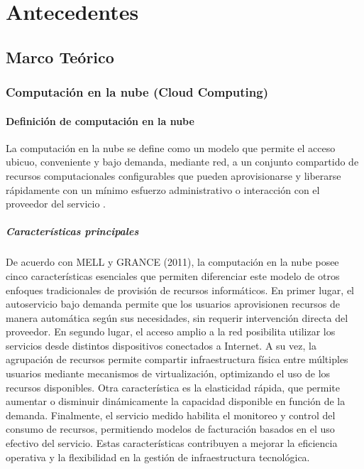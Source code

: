 \chapter{Antecedentes}

\section{Marco Teórico}

\subsection{Computación en la nube (Cloud Computing)}

\subsubsection{Definición de computación en la nube}

La computación en la nube se define como un modelo que permite el acceso ubicuo, conveniente y bajo demanda, mediante red, a un conjunto compartido de recursos computacionales configurables que pueden aprovisionarse y liberarse rápidamente con un mínimo esfuerzo administrativo o interacción con el proveedor del servicio \parencite{Mell2011}.

\paragraph{Características principales}

De acuerdo con MELL y GRANCE (2011), la computación en la nube posee cinco características esenciales que permiten diferenciar este modelo de otros enfoques tradicionales de provisión de recursos informáticos. En primer lugar, el autoservicio bajo demanda permite que los usuarios aprovisionen recursos de manera automática según sus necesidades, sin requerir intervención directa del proveedor. En segundo lugar, el acceso amplio a la red posibilita utilizar los servicios desde distintos dispositivos conectados a Internet. A su vez, la agrupación de recursos permite compartir infraestructura física entre múltiples usuarios mediante mecanismos de virtualización, optimizando el uso de los recursos disponibles. Otra característica es la elasticidad rápida, que permite aumentar o disminuir dinámicamente la capacidad disponible en función de la demanda. Finalmente, el servicio medido habilita el monitoreo y control del consumo de recursos, permitiendo modelos de facturación basados en el uso efectivo del servicio. Estas características contribuyen a mejorar la eficiencia operativa y la flexibilidad en la gestión de infraestructura tecnológica.

